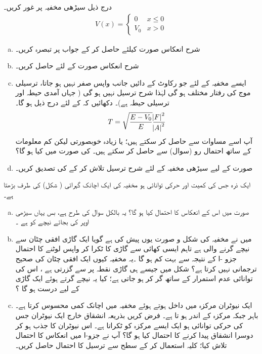  درج ذیل سیڑھی مخفیہ  پر غور کریں۔
\begin{align*}
V(x)=
\begin{cases}
0 & x\le 0\\
V_{0}&x> 0
\end{cases}
\end{align*}
%
\begin{enumerate}[a.]
\item
  شرح انعکاس      صورت کیلئے  حاصل کر کے  جواب پر تبصرہ کریں۔ 
\item
شرح  انعکاس     صورت کے لئے حاصل  کریں۔ 
\item
ایسے  مخفیہ کے لئے   جو رکاوٹ کے دائیں جانب  واپس صفر  نہیں ہو  جاتا،  ترسیلی موج کی رفتار مختلف ہو گی   لہٰذا    شرح ترسیل  نہیں ہو گی ( جہاں   آمدی حیطہ   اور ترسیلی  حیطہ  ہے)۔ دکھائیں  کہ  کے لئے درج ذیل ہو گا۔
\begin{align}
 T=\sqrt{\frac{E-V_{0}}{E}  }\frac{\abs{F}^{2}}{\abs{A}^{2}} 
 \end{align}
   آپ اسے مساوات سے حاصل کر سکتے ہیں؛  یا زیادہ  خوبصورتی لیکن  کم معلومات کے ساتھ   احتمال رو  (سوال) سے حاصل کر سکتے ہیں۔    کی صورت میں   کیا ہو گا؟
\item

صورت  کے لیے سیڑھی  مخفیہ کے لئے شرح ترسیل تلاش کر کے  کی تصدیق کریں۔
\end{enumerate}
ایک ذرہ جس کی کمیت   اور حرکی توانائی  ہو مخفیہ کی  ایک اچانک گہرائی   ( شکل)  کی طرف بڑھتا ہے۔ 

\begin{enumerate}[a.]
\item
  صورت     میں اس کے  انعکاس کا احتمال کیا ہو گا؟   یہ بالکل سوال   کی طرح ہے،  بس یہاں سیڑھی  اوپر کی  بجائے نیچے کو  ہے ۔
\item 
 میں نے مخفیہ کی  شکل و صورت  یوں  پیش کی ہے گویا  ایک گاڑی  افقی  چٹان سے نیچے گرنے والی ہے تاہم  ایسی کھائی سے  گاڑی کا ٹکرا کر واپس لوٹنے   کا احتمال جزو -ا کے نتیجہ سے بہت کم ہو گا ۔یہ مخفیہ  کیوں ایک افقی  چٹان کی صحیح ترجمانی نہیں کرتا ہے؟    شکل میں جیسے ہی گاڑی نقطہ   پر سے گزرتی ہے ، اس کی توانائی عدم استمرار کے ساتھ گر کر  ہو جاتی ہے؛  کیا   یہ   نیچے  گرتے  ہوئے  ایک گاڑی کے لیے  درست  ہو گا ؟
\item
ایک  نیوٹران مرکزہ  میں داخل ہوتے ہوئے  مخفیہ میں اچانک کمی محسوس کرتا ہے۔ باہر  جبکہ مرکزہ کے اندر  ہو تا ہے۔  فرض کریں  بذریعہ  انشقاق خارج  ایک نیوٹران جس کی حرکی توانائی  ہو ایک ایسے مرکزہ کو ٹکراتا ہے۔ اس نیوٹران کا جذب  ہو کر  دوسرا  انشقاق پیدا کرنے کا احتمال کیا ہو گا؟   آپ نے جزو-ا میں انعکاس کا  احتمال تلاش کیا؛ کلیہ  استعمال کر  کے سطح سے ترسیل کا احتمال حاصل کریں۔
\end{enumerate}

